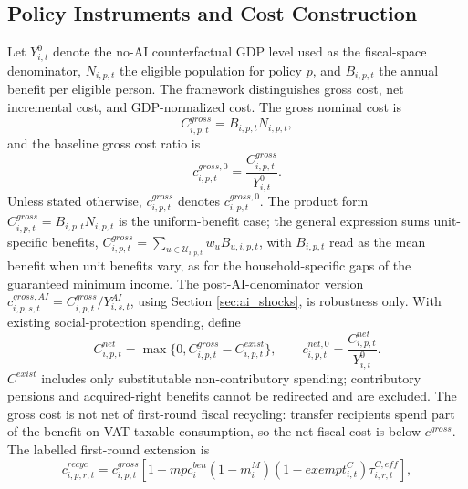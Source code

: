 \documentclass[11pt,a4paper]{article}
\begin{document}
\subsection{Policy Instruments and Cost Construction}\label{sec:policy_costs}

Let $Y^0_{i,t}$ denote the no-AI counterfactual GDP level used as the fiscal-space denominator, $N_{i,p,t}$ the eligible population for policy $p$, and $B_{i,p,t}$ the annual benefit per eligible person. The framework distinguishes gross cost, net incremental cost, and GDP-normalized cost. The gross nominal cost is
\begin{equation}
    C^{gross}_{i,p,t}=B_{i,p,t}N_{i,p,t},
\end{equation}
and the baseline gross cost ratio is
\begin{equation}
    c^{gross,0}_{i,p,t}=\frac{C^{gross}_{i,p,t}}{Y^0_{i,t}}.
\end{equation}
Unless stated otherwise, $c^{gross}_{i,p,t}$ denotes $c^{gross,0}_{i,p,t}$. The product form $C^{gross}_{i,p,t}=B_{i,p,t}N_{i,p,t}$ is the uniform-benefit case; the general expression sums unit-specific benefits, $C^{gross}_{i,p,t}=\sum_{u\in\mathcal{U}_{i,p,t}}w_u B_{u,i,p,t}$, with $B_{i,p,t}$ read as the mean benefit when unit benefits vary, as for the household-specific gaps of the guaranteed minimum income. The post-AI-denominator version $c^{gross,AI}_{i,p,s,t}=C^{gross}_{i,p,t}/Y^{AI}_{i,s,t}$, using Section \ref{sec:ai_shocks}, is robustness only. With existing social-protection spending, define
\begin{equation}
    C^{net}_{i,p,t}=\max\{0,C^{gross}_{i,p,t}-C^{exist}_{i,p,t}\},
    \qquad
    c^{net,0}_{i,p,t}=\frac{C^{net}_{i,p,t}}{Y^0_{i,t}}.
\end{equation}
$C^{exist}$ includes only substitutable non-contributory spending; contributory pensions and acquired-right benefits cannot be redirected and are excluded.
The gross cost is not net of first-round fiscal recycling: transfer recipients spend part of the benefit on VAT-taxable consumption, so the net fiscal cost is below $c^{gross}$. The labelled first-round extension is
\begin{equation}\label{eq:first_round_benefit_recycling_e5}
    c^{recyc}_{i,p,r,t}=c^{gross}_{i,p,t}\left[1-mpc^{ben}_i(1-m^M_i)(1-exempt^C_{i,t})\tau^{C,eff}_{i,r,t}\right],
\end{equation}
\end{document}
